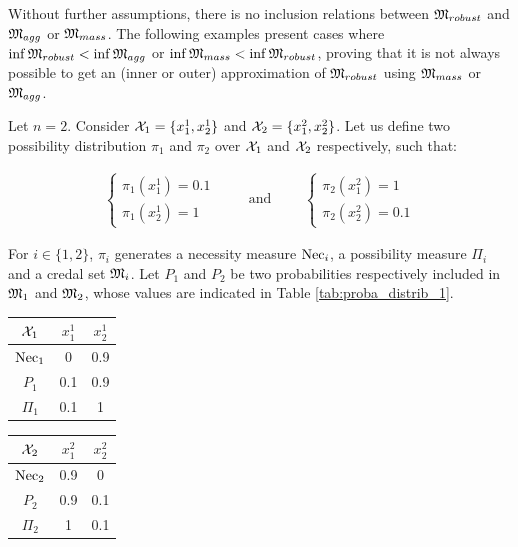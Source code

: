 Without further assumptions, there is no inclusion relations between ${\mathfrak{M}}_{robust}$ and ${\mathfrak{M}}_{agg}$ or ${\mathfrak{M}}_{mass}$. The following examples present cases where $\inf{\mathfrak{M}}_{robust}<\inf{\mathfrak{M}}_{agg}$ or $\inf{\mathfrak{M}}_{mass}<\inf{\mathfrak{M}}_{robust}$, proving that it is not always possible to get an (inner or outer) approximation of ${\mathfrak{M}}_{robust}$ using ${\mathfrak{M}}_{mass}$ or ${\mathfrak{M}}_{agg}$.

\begin{example}\label{ex:necessity}
    Let $n=2$. Consider ${\mathcal{X}}_1=\{x^1_1, x^1_2\}$ and ${\mathcal{X}}_2=\{x^2_1, x^2_2\}$. Let us define two possibility distribution $\pi_1$ and $\pi_2$ over ${\mathcal{X}}_1$ and ${\mathcal{X}}_2$ respectively, such that:

    \begin{eqnarray*}
    \begin{cases}
        \pi_1(x^1_1) = 0.1\\
        \pi_1(x^1_2) = 1
    \end{cases}
    \qquad\text{ and }\qquad
    \begin{cases}
        \pi_2(x^2_1)=1\\
        \pi_2(x^2_2)=0.1
    \end{cases}
    \end{eqnarray*}
    
    For $i\in\{1,2\}$, $\pi_i$ generates a necessity measure ${\mathrm{Nec}}_i$, a possibility measure $\Pi_i$ and a credal set ${\mathfrak{M}}_i$. Let $P_1$ and $P_2$ be two probabilities respectively included in ${\mathfrak{M}}_1$ and ${\mathfrak{M}}_2$,  whose values are indicated in Table \ref{tab:proba_distrib_1}. 
    
    \begin{center}
    \begin{tabular}{|c|c|c|}
        \hline
        ${\mathcal{X}}_1$ & $x^1_1$ & $x^1_2$\\
        \hline\hline
        ${\mathrm{Nec}}_1$ & 0 & 0.9\\
        \hline
        $P_1$  & 0.1 & 0.9\\
        \hline
        $\Pi_1$ & 0.1 & 1\\
        \hline
    \end{tabular}
    \quad
    \begin{tabular}{|c|c|c|}
        \hline
        ${\mathcal{X}}_2$ & $x^2_1$ & $x^2_2$\\
        \hline\hline
        ${\mathrm{Nec}}_2$ & 0.9 & 0\\
        \hline
        $P_2$  & 0.9 & 0.1\\
        \hline
        $\Pi_2$ & 1 & 0.1\\
        \hline
    \end{tabular}
    \label{tab:proba_distrib_1}
    \end{center}


\end{example}
